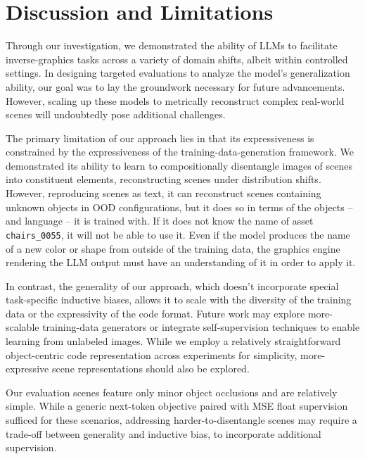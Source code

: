 \section{Discussion and Limitations}
Through our investigation, we demonstrated the ability of LLMs to facilitate inverse-graphics tasks across a variety of domain shifts, albeit within controlled settings.
In designing targeted evaluations to analyze the model's generalization ability, our goal was to lay the groundwork necessary for future advancements.
However, scaling up these models to metrically reconstruct complex real-world scenes will undoubtedly pose additional challenges.

The primary limitation of our approach lies in that its expressiveness is constrained by the expressiveness of the training-data-generation framework.
We demonstrated its ability to learn to compositionally disentangle images of scenes into constituent elements, reconstructing scenes under distribution shifts.
However, reproducing scenes as text, it can reconstruct scenes containing unknown objects in OOD configurations, but it does so in terms of the objects -- and language -- it is trained with.
If it does not know the name of asset \mbox{\texttt{chairs\_0055}}, it will not be able to use it.
Even if the model produces the name of a new color or shape from outside of the training data, the graphics engine rendering the LLM output must have an understanding of it in order to apply it.

In contrast, the generality of our approach, which doesn't incorporate special task-specific inductive biases, allows it to scale with the diversity of the training data or the expressivity of the code format.
Future work may explore more-scalable training-data generators or integrate self-supervision techniques to enable learning from unlabeled images.
While we employ a relatively straightforward object-centric code representation across experiments for simplicity, more-expressive scene representations should also be explored.

Our evaluation scenes feature only minor object occlusions and are relatively simple.
While a generic next-token objective paired with MSE float supervision sufficed for these scenarios, addressing harder-to-disentangle scenes may require a trade-off between generality and inductive bias, to incorporate additional supervision.
